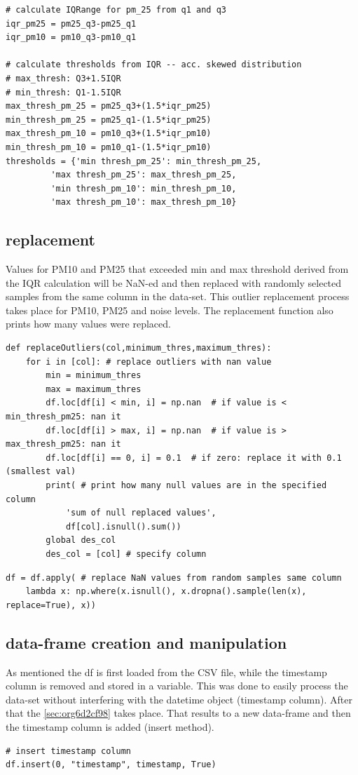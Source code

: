 \documentclass[11pt]{article}
\begin{document}
\begin{verbatim}
# calculate IQRange for pm_25 from q1 and q3
iqr_pm25 = pm25_q3-pm25_q1
iqr_pm10 = pm10_q3-pm10_q1

# calculate thresholds from IQR -- acc. skewed distribution
# max_thresh: Q3+1.5IQR
# min_thresh: Q1-1.5IQR
max_thresh_pm_25 = pm25_q3+(1.5*iqr_pm25)
min_thresh_pm_25 = pm25_q1-(1.5*iqr_pm25)
max_thresh_pm_10 = pm10_q3+(1.5*iqr_pm10)
min_thresh_pm_10 = pm10_q1-(1.5*iqr_pm10)
thresholds = {'min thresh_pm_25': min_thresh_pm_25,
         'max thresh_pm_25': max_thresh_pm_25,
         'min thresh_pm_10': min_thresh_pm_10,
         'max thresh_pm_10': max_thresh_pm_10}
\end{verbatim}

\subsection{replacement}
\label{sec:org1dde69b}
Values for PM10 and PM25 that exceeded min and max threshold derived from the IQR calculation will be NaN-ed and then replaced with randomly selected samples from the same column in the data-set.  This outlier replacement process takes place for PM10, PM25 and noise levels.  The replacement function also prints how many values were replaced.

\begin{verbatim}
def replaceOutliers(col,minimum_thres,maximum_thres):
    for i in [col]: # replace outliers with nan value
        min = minimum_thres
        max = maximum_thres
        df.loc[df[i] < min, i] = np.nan  # if value is < min_thresh_pm25: nan it
        df.loc[df[i] > max, i] = np.nan  # if value is > max_thresh_pm25: nan it
        df.loc[df[i] == 0, i] = 0.1  # if zero: replace it with 0.1 (smallest val)
        print( # print how many null values are in the specified column
            'sum of null replaced values',
            df[col].isnull().sum())
        global des_col
        des_col = [col] # specify column
\end{verbatim}

\begin{verbatim}
df = df.apply( # replace NaN values from random samples same column
    lambda x: np.where(x.isnull(), x.dropna().sample(len(x), replace=True), x))
\end{verbatim}

\subsection{data-frame creation and manipulation}
\label{sec:orgc42a9f4}
As mentioned the df is first loaded from the CSV file, while the timestamp column is removed and stored in a variable.  This was done to easily process the data-set without interfering with the datetime object (timestamp column).  After that the \ref{sec:org6d2cf98} takes place.  That results to a new data-frame and then the timestamp column is added (insert method).
\begin{verbatim}
# insert timestamp column
df.insert(0, "timestamp", timestamp, True)
\end{verbatim}
\end{document}
